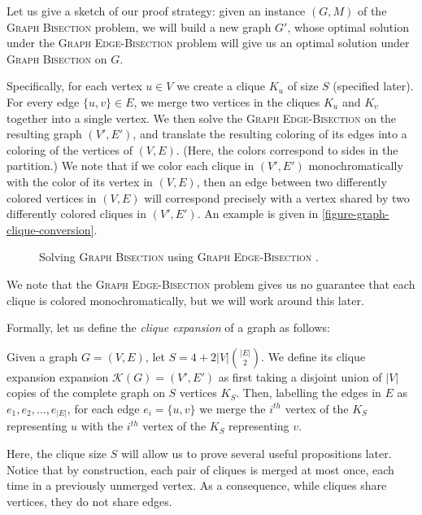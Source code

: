 \documentclass{article}
\newcommand{\gb}{\textsc{Graph \allowbreak Bisection} }
\newcommand{\geb}{\textsc{Graph \allowbreak Edge-\allowbreak Bisection} }
\begin{document}
	Let us give a sketch of our proof strategy:
	given an instance $(G, M)$ of the \gb problem, we
	will build a new graph $G'$, whose optimal solution under the 
	\geb problem will give us an optimal solution under \gb on $G$.

	Specifically, for each vertex $u \in V$ we create a clique $K_u$ of size
	$S$ (specified later). For every edge $\{u, v\} \in E$, we merge
	two vertices in the cliques $K_u$ and $K_v$ together into a single
	vertex. We then solve the \geb on the resulting graph $(V', E')$, and
	translate the resulting coloring of its edges into a coloring of the
	vertices of $(V, E)$. (Here, the colors correspond to sides in the
	partition.) We note that if we color each clique in $(V', E')$
	monochromatically with the color of its vertex in $(V, E)$, then
	an edge between two differently colored vertices in $(V, E)$ will
	correspond precisely with a vertex shared by two differently colored
	cliques in $(V', E')$.
	An example is given in \autoref{figure-graph-clique-conversion}.

	\begin{figure}[h]
		
		\centering
		\caption{Solving \gb using \geb.}
		\label{figure-graph-clique-conversion}
	\end{figure}

	We note that
	the \geb problem gives us no guarantee that each clique is colored
	monochromatically, but we will work around this later.

	Formally, let us define the \textit{clique expansion} of a graph as
	follows:

	\begin{definition}
		\label{clique-expansion}
		Given a graph $G = (V, E)$,
		let $S = 4 + 2|V|\binom{|E|}{2}$.
		We define its clique expansion expansion
		$\mathcal{K}(G) = (V', E')$ as first taking a disjoint union of $|V|$
		copies of the complete graph on $S$ vertices $K_S$. Then, labelling the
		edges in $E$ as $e_1, e_2, \dots, e_{|E|}$, for each edge
		$e_i = \{u, v\}$
		we merge the $i^{th}$ vertex of the $K_S$ representing $u$ with the
		$i^{th}$ vertex of the $K_S$ representing $v$.
	\end{definition}

	Here, the clique size $S$ will allow us to prove several
	useful propositions later. Notice that by construction, each pair of
	cliques is merged at most once, each time in a previously unmerged vertex.
	As a consequence, while cliques share vertices, they do not share edges.
\end{document}

